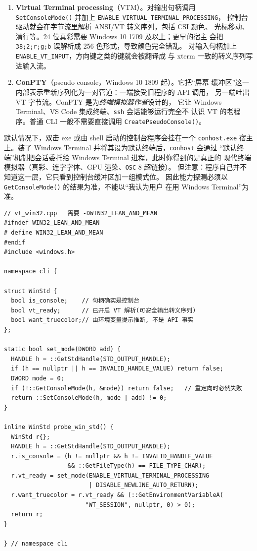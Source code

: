 \documentclass[12pt,a4paper,fontset=fandol]{ctexbook}
\newcommand{\Fn}[1]{\texttt{#1()}}
\newcommand{\Tp}[1]{\texttt{#1}}
\begin{document}
\begin{enumerate}
\item \textbf{Virtual Terminal processing}（VTM）。对输出句柄调用
      \Fn{SetConsoleMode} 并加上 \Tp{ENABLE\_VIRTUAL\_TERMINAL\_PROCESSING}，
      控制台驱动就会在字节流里解析 ANSI/VT 转义序列，包括 CSI 颜色、
      光标移动、清行等。24 位真彩需要 Windows 10 1709 及以上；更早的宿主
      会把 \Tp{38;2;r;g;b} 误解析成 256 色形式，导致颜色完全错乱。
      对输入句柄加上 \Tp{ENABLE\_VT\_INPUT}，方向键之类的键就会被翻译成
      与 xterm 一致的转义序列写进输入流。
\item \textbf{ConPTY}（pseudo console，Windows 10 1809 起）。它把``屏幕
      缓冲区''这一内部表示重新序列化为一对管道：一端接受旧程序的 API 调用，
      另一端吐出 VT 字节流。ConPTY 是为\emph{终端模拟器作者}设计的，
      它让 Windows Terminal、VS Code 集成终端、\Tp{ssh} 会话能够运行完全不
      认识 VT 的老程序。普通 CLI 一般不需要直接调用 \Fn{CreatePseudoConsole}。
\end{enumerate}

\begin{note}[title={Windows Terminal 与 conhost 的关系}]
默认情况下，双击 exe 或由 shell 启动的控制台程序会挂在一个 \Tp{conhost.exe}
宿主上。装了 Windows Terminal 并将其设为默认终端后，\Tp{conhost} 会通过
``默认终端''机制把会话委托给 Windows Terminal 进程，此时你得到的是真正的
现代终端模拟器（真彩、连字字体、GPU 渲染、\Tp{OSC} 8 超链接）。
但注意：程序自己并不知道这一层，它只看到控制台缓冲区加一组模式位。
因此能力探测必须以 \Fn{GetConsoleMode} 的结果为准，不能以``我认为用户
在用 Windows Terminal''为准。
\end{note}

\begin{lstlisting}[caption={Windows 侧启用 VT 解析的正确写法}]
// vt_win32.cpp   需要 -DWIN32_LEAN_AND_MEAN
#ifndef WIN32_LEAN_AND_MEAN
# define WIN32_LEAN_AND_MEAN
#endif
#include <windows.h>

namespace cli {

struct WinStd {
  bool is_console;    // 句柄确实是控制台
  bool vt_ready;      // 已开启 VT 解析(可安全输出转义序列)
  bool want_truecolor;// 由环境变量提示推断, 不是 API 事实
};

static bool set_mode(DWORD add) {
  HANDLE h = ::GetStdHandle(STD_OUTPUT_HANDLE);
  if (h == nullptr || h == INVALID_HANDLE_VALUE) return false;
  DWORD mode = 0;
  if (!::GetConsoleMode(h, &mode)) return false;   // 重定向时必然失败
  return ::SetConsoleMode(h, mode | add) != 0;
}

inline WinStd probe_win_std() {
  WinStd r{};
  HANDLE h = ::GetStdHandle(STD_OUTPUT_HANDLE);
  r.is_console = (h != nullptr && h != INVALID_HANDLE_VALUE
                  && ::GetFileType(h) == FILE_TYPE_CHAR);
  r.vt_ready = set_mode(ENABLE_VIRTUAL_TERMINAL_PROCESSING
                        | DISABLE_NEWLINE_AUTO_RETURN);
  r.want_truecolor = r.vt_ready && (::GetEnvironmentVariableA(
                       "WT_SESSION", nullptr, 0) > 0);
  return r;
}

} // namespace cli
\end{lstlisting}
\end{document}
